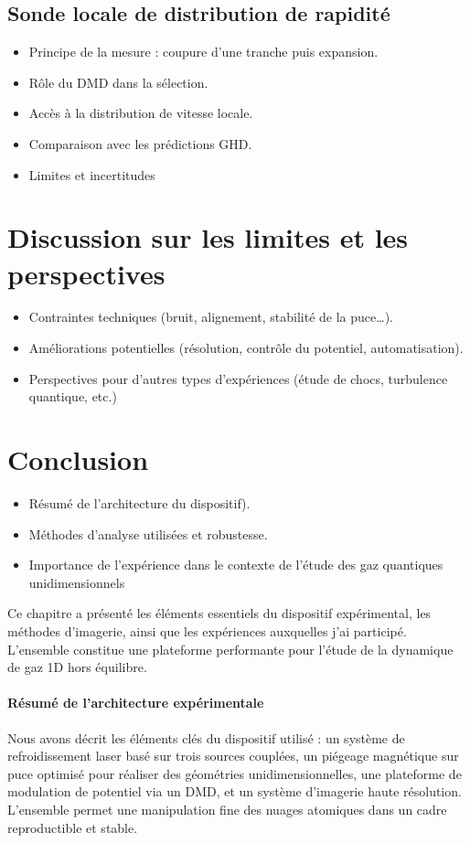 \subsection{Sonde locale de distribution de rapidité}
\begin{itemize}
    \item Principe de la mesure : coupure d’une tranche puis expansion.
    \item Rôle du DMD dans la sélection.
    \item Accès à la distribution de vitesse locale.
    \item Comparaison avec les prédictions GHD.
    \item Limites et incertitudes
\end{itemize}

\section{Discussion sur les limites et les perspectives}
\begin{itemize}
    \item Contraintes techniques (bruit, alignement, stabilité de la puce…).
    \item Améliorations potentielles (résolution, contrôle du potentiel, automatisation).
    \item Perspectives pour d’autres types d’expériences (étude de chocs, turbulence quantique, etc.)
\end{itemize}

\section*{Conclusion}
\begin{itemize}
    \item Résumé de l’architecture du dispositif).
    \item Méthodes d’analyse utilisées et robustesse.
    \item Importance de l’expérience dans le contexte de l’étude des gaz quantiques unidimensionnels
\end{itemize}
Ce chapitre a présenté les éléments essentiels du dispositif expérimental, les méthodes d’imagerie, ainsi que les expériences auxquelles j’ai participé. L’ensemble constitue une plateforme performante pour l’étude de la dynamique de gaz 1D hors équilibre.

\paragraph{Résumé de l’architecture expérimentale}  
Nous avons décrit les éléments clés du dispositif utilisé : un système de refroidissement laser basé sur trois sources couplées, un piégeage magnétique sur puce optimisé pour réaliser des géométries unidimensionnelles, une plateforme de modulation de potentiel via un DMD, et un système d’imagerie haute résolution. L’ensemble permet une manipulation fine des nuages atomiques dans un cadre reproductible et stable.

